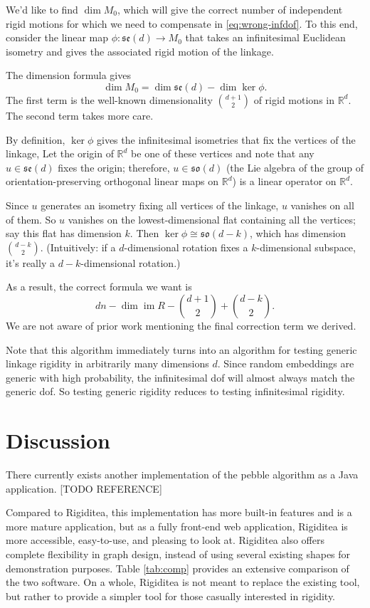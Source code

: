 \documentclass[aps,prd,final,twocolumn,letterpaper,nofootinbib]{revtex4-1}
\newcommand\RR{\mathbb{R}}
\DeclareMathOperator\im{im}
\begin{document}
We'd like to find $\dim M_0$,
which will give the correct number of independent rigid motions
for which we need to compensate in \cref{eq:wrong-infdof}.
To this end,
consider the linear map $\phi\colon\mathfrak{se}(d) \to M_0$
that takes an infinitesimal Euclidean isometry
and gives the associated rigid motion of the linkage.

The dimension formula gives
\[
    \dim M_0 = \dim\mathfrak{se}(d) - \dim\ker\phi.
\]
The first term is the well-known dimensionality $\binom{d+1}{2}$
of rigid motions in $\RR^d$.
The second term takes more care.

By definition, $\ker\phi$ gives the infinitesimal isometries
that fix the vertices of the linkage,
Let the origin of $\RR^d$ be one of these vertices
and note that any $u\in \mathfrak{se}(d)$ fixes the origin;
therefore, $u\in\mathfrak{so}(d)$
(the Lie algebra of the group
of orientation-preserving orthogonal linear maps on $\RR^d$)
is a linear operator on $\RR^d$.

Since $u$ generates an isometry fixing all vertices of the linkage,
$u$ vanishes on all of them.
So $u$ vanishes on the lowest-dimensional flat containing all the vertices;
say this flat has dimension $k$.
Then $\ker\phi\cong\mathfrak{so}(d-k)$, which has dimension $\binom{d-k}{2}$.
(Intuitively: if a $d$-dimensional rotation fixes a $k$-dimensional subspace,
it's really a $d-k$-dimensional rotation.)

As a result, the correct formula we want is
\begin{equation}
    dn - \dim\im R - \binom{d+1}{2} + \binom{d-k}{2}.
\end{equation}
We are not aware of prior work mentioning the final correction term we derived.

Note that this algorithm immediately turns into an algorithm
for testing generic linkage rigidity in arbitrarily many dimensions $d$.
Since random embeddings are generic with high probability,
the infinitesimal dof will almost always match the generic dof.
So testing generic rigidity reduces to testing infinitesimal rigidity.


\section{Discussion}

There currently exists another
implementation of the pebble algorithm as a Java application.
[TODO REFERENCE]

Compared to Rigiditea, this implementation
has more built-in features and is a more mature application,
but as a fully front-end web application,
Rigiditea is more accessible, easy-to-use, and pleasing to look at.
Rigiditea also offers complete flexibility in graph design,
instead of using several existing shapes for demonstration purposes.
Table \ref{tab:comp} provides an extensive comparison of the two software.
On a whole, Rigiditea is not meant to replace the existing tool,
but rather to provide a simpler tool for those casually interested
in rigidity.
\end{document}
